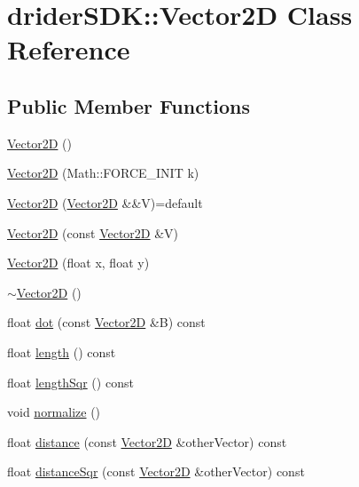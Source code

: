 \hypertarget{classdrider_s_d_k_1_1_vector2_d}{}\section{drider\+S\+DK\+:\+:Vector2D Class Reference}
\label{classdrider_s_d_k_1_1_vector2_d}
\subsection*{Public Member Functions}
\begin{DoxyCompactItemize}
\item 
\hyperlink{classdrider_s_d_k_1_1_vector2_d_aba8cc384436dbc1f1b35ee12e9289c96}{Vector2D} ()
\item 
\hyperlink{classdrider_s_d_k_1_1_vector2_d_adf3c51c5f539f2dab7bfb5c6f0de3b1f}{Vector2D} (Math\+::\+F\+O\+R\+C\+E\+\_\+\+I\+N\+IT k)
\item 
\hyperlink{classdrider_s_d_k_1_1_vector2_d_a5e6fbbc64288d81ba99627f705f03db0}{Vector2D} (\hyperlink{classdrider_s_d_k_1_1_vector2_d}{Vector2D} \&\&V)=default
\item 
\hyperlink{classdrider_s_d_k_1_1_vector2_d_a7207453b631548a7b8ae1c627d5d877c}{Vector2D} (const \hyperlink{classdrider_s_d_k_1_1_vector2_d}{Vector2D} \&V)
\item 
\hyperlink{classdrider_s_d_k_1_1_vector2_d_a75227850e15a7f7b166ef61d78b981da}{Vector2D} (float x, float y)
\item 
\hyperlink{classdrider_s_d_k_1_1_vector2_d_a3736a27775fe55038923bb80c3936dad}{$\sim$\+Vector2D} ()
\item 
float \hyperlink{classdrider_s_d_k_1_1_vector2_d_af12eaa67f2debd35b66eda9964017d93}{dot} (const \hyperlink{classdrider_s_d_k_1_1_vector2_d}{Vector2D} \&B) const
\item 
float \hyperlink{classdrider_s_d_k_1_1_vector2_d_a42e8c173c88490fca4f2a4e33c170c5f}{length} () const
\item 
float \hyperlink{classdrider_s_d_k_1_1_vector2_d_a3d1db22bc33394ce4a20892ed70ca497}{length\+Sqr} () const
\item 
void \hyperlink{classdrider_s_d_k_1_1_vector2_d_a67697bc0a38ec9f9d7cf072ba2c82a77}{normalize} ()
\item 
float \hyperlink{classdrider_s_d_k_1_1_vector2_d_a3da231806cb624d3887943ce23cd44f8}{distance} (const \hyperlink{classdrider_s_d_k_1_1_vector2_d}{Vector2D} \&other\+Vector) const
\item 
float \hyperlink{classdrider_s_d_k_1_1_vector2_d_aed36b461864f39075e5b21547a0c2c9a}{distance\+Sqr} (const \hyperlink{classdrider_s_d_k_1_1_vector2_d}{Vector2D} \&other\+Vector) const

\end{DoxyCompactItemize}
